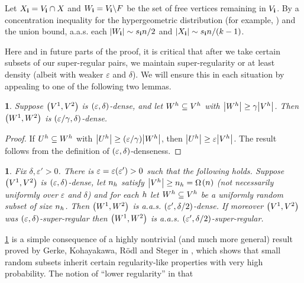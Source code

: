 \documentclass[11pt,english]{article}
\theoremstyle{plain}
\theoremstyle{plain}
\theoremstyle{plain}
\newtheorem{lem}[thm]{\protect\lemmaname}
\theoremstyle{plain}
\theoremstyle{plain}
\theoremstyle{definition}
\theoremstyle{definition}
\theoremstyle{remark}
\theoremstyle{remark}
\theoremstyle{plain}
\theoremstyle{definition}
\theoremstyle{definition}
\theoremstyle{plain}
\theoremstyle{plain}
\theoremstyle{plain}
\newtheorem{mylem}[mythm]{\protect\lemmaname}
\renewenvironment{lem}{\begin{mylem}}{\end{mylem}}
\theoremstyle{plain}
\theoremstyle{remark}
\theoremstyle{plain}
\theoremstyle{definition}
\let\originalleft\left
\let\originalright\right
\renewcommand{\left}{\mathopen{}\mathclose\bgroup\originalleft}
\renewcommand{\right}{\aftergroup\egroup\originalright}
\providecommand{\lemmaname}{Lemma}
\begin{document}
Let $X_{\mathbf{i}}=V_{\mathbf{i}}\cap X$ and $W_{\mathbf{i}}=V_{\mathbf{i}}\backslash F$ be
the set of free vertices remaining in $V_{\mathbf{i}}$. By a concentration
inequality for the hypergeometric distribution (for example, \cite[Theorem 2.10]{JLR00})
and the union bound, a.a.s. each $\left|W_{\bi}\right|\sim s_{\bi}n/2$
and $\left|X_{\bi}\right|\sim s_{\bi}n/\left(k-1\right)$.

Here and in future parts of the proof, it is critical that after we
take certain subsets of our super-regular pairs, we maintain super-regularity
or at least density (albeit with weaker $\varepsilon$ and $\delta$).
We will ensure this in each situation by appealing to one of the following
two lemmas.
\begin{lem}
\label{lem:large-preserves-dense}Suppose $\left(V^{1},V^{2}\right)$
is $\left(\varepsilon,\delta\right)$-dense, and let $W^{h}\subseteq V^{h}$
with $\left|W^{\h}\right|\ge\gamma\left|V^{\h}\right|$. Then $\left(W^{1},W^{2}\right)$
is $\left(\varepsilon/\gamma,\delta\right)$-dense.\end{lem}
\begin{proof}
If $U^{h}\subseteq W^{h}$ with $\left|U^{\h}\right|\ge\left(\varepsilon/\gamma\right)\left|W^{\h}\right|$,
then $\left|U^{\h}\right|\ge\varepsilon\left|V^{\h}\right|$. The
result follows from the definition of $\left(\varepsilon,\delta\right)$-denseness.\end{proof}
\begin{lem}
\label{lem:random-preserves-superregular}Fix $\delta,\varepsilon'>0$.
There is $\varepsilon=\varepsilon\left(\varepsilon'\right)>0$ such
that the following holds. Suppose $\left(V^{1},V^{2}\right)$ is $\left(\varepsilon,\delta\right)$-dense,
let $n_{h}$ satisfy $\left|V^{\h}\right|\ge n_{\h}=\Omega$$\left(n\right)$
(not necessarily uniformly over $\varepsilon$ and $\delta$) and
for each $h$ let $W^{h}\subseteq V^{h}$ be a uniformly random
subset of size $n_{h}$. Then $\left(W^{1},W^{2}\right)$ is a.a.s.
$\left(\varepsilon',\delta/2\right)$-dense. If moreover $\left(V^{1},V^{2}\right)$
was $\left(\varepsilon,\delta\right)$-super-regular then $\left(W^{1},W^{2}\right)$
is a.a.s. $\left(\varepsilon',\delta/2\right)$-super-regular.
\end{lem}
\ref{lem:random-preserves-superregular} is a simple consequence of
a highly nontrivial (and much more general) result proved by Gerke,
Kohayakawa, R\"odl and Steger in \cite{GKRS07}, which shows that
small random subsets inherit certain regularity-like properties with
very high probability. The notion of ``lower regularity'' in that
\end{document}
